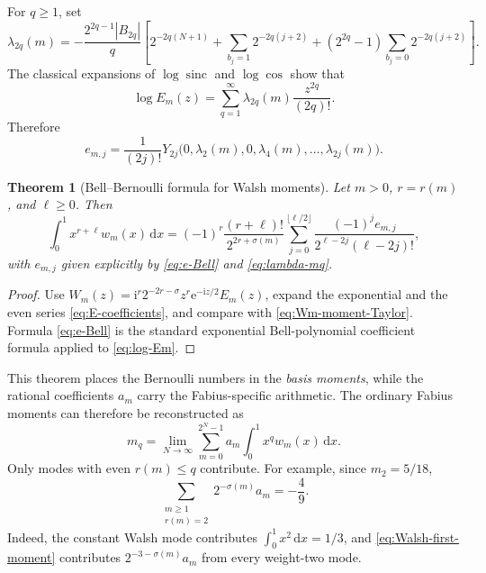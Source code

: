 \documentclass[11pt,oneside]{article}
\newtheorem{theorem}{Theorem}[section]
\theoremstyle{definition}
\theoremstyle{remark}
\newcommand{\sinc}{\operatorname{sinc}}
\newcommand{\e}{\mathrm e}
\newcommand{\ii}{\mathrm i}
\newcommand{\dd}{\,\mathrm d}
\begin{document}
For $q\ge1$, set
\begin{equation}\label{eq:lambda-mq}
 \lambda_{2q}(m)
 =-\frac{2^{2q-1}|B_{2q}|}{q}
 \left[
  2^{-2q(N+1)}
  +\sum_{b_j=1}2^{-2q(j+2)}
  +(2^{2q}-1)\sum_{b_j=0}2^{-2q(j+2)}
 \right].
\end{equation}
The classical expansions of $\log\sinc$ and $\log\cos$ show that
\begin{equation}\label{eq:log-Em}
 \log E_m(z)=\sum_{q=1}^\infty
 \lambda_{2q}(m)\frac{z^{2q}}{(2q)!}.
\end{equation}
Therefore
\begin{equation}\label{eq:e-Bell}
 e_{m,j}=\frac1{(2j)!}
 Y_{2j}\bigl(0,\lambda_2(m),0,\lambda_4(m),\ldots,
              \lambda_{2j}(m)\bigr).
\end{equation}

\begin{theorem}[Bell--Bernoulli formula for Walsh moments]
\label{thm:Walsh-Bell-moments}
Let $m>0$, $r=r(m)$, and $\ell\ge0$.  Then
\begin{equation}\label{eq:Walsh-higher-moments}
 \int_0^1x^{r+\ell}w_m(x)\dd x
 =(-1)^r\frac{(r+\ell)!}{2^{2r+\sigma(m)}}
 \sum_{j=0}^{\lfloor\ell/2\rfloor}
 \frac{(-1)^je_{m,j}}
      {2^{\ell-2j}(\ell-2j)!},
\end{equation}
with $e_{m,j}$ given explicitly by \eqref{eq:e-Bell} and
\eqref{eq:lambda-mq}.
\end{theorem}

\begin{proof}
Use
$W_m(z)=\ii^r2^{-2r-\sigma}z^r\e^{-\ii z/2}E_m(z)$,
expand the exponential and the even series \eqref{eq:E-coefficients}, and
compare with \eqref{eq:Wm-moment-Taylor}.  Formula \eqref{eq:e-Bell} is the
standard exponential Bell-polynomial coefficient formula applied to
\eqref{eq:log-Em}.
\end{proof}

This theorem places the Bernoulli numbers in the \emph{basis moments}, while
the rational coefficients $a_m$ carry the Fabius-specific arithmetic.  The
ordinary Fabius moments can therefore be reconstructed as
\begin{equation}\label{eq:Fabius-moment-Walsh}
 m_q=\lim_{N\to\infty}
 \sum_{m=0}^{2^N-1}a_m\int_0^1x^qw_m(x)\dd x.
\end{equation}
Only modes with even $r(m)\le q$ contribute.  For example, since
$m_2=5/18$,
\begin{equation}\label{eq:weight-two-sum-rule}
 \sum_{\substack{m\ge1\\r(m)=2}}
 2^{-\sigma(m)}a_m=-\frac49.
\end{equation}
Indeed, the constant Walsh mode contributes $\int_0^1x^2\dd x=1/3$, and
\eqref{eq:Walsh-first-moment} contributes
$2^{-3-\sigma(m)}a_m$ from every weight-two mode.
\end{document}
